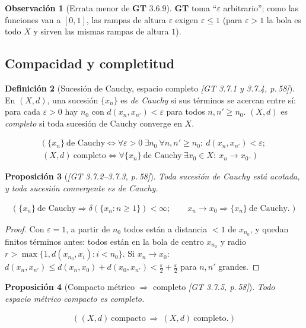 \documentclass[11pt,a4paper]{article}
\newcommand{\lgc}[1]{\par\vspace{-3pt}\begin{gather*}\big(\;#1\;\big)\end{gather*}\vspace{-6pt}}
\theoremstyle{definition}
\newtheorem{definicion}{Definición}[section]
\newtheorem{observacion}[definicion]{Observación}
\theoremstyle{plain}
\newtheorem{proposicion}[definicion]{Proposición}
\newcommand{\fnt}[1]{{\normalfont\small\itshape\color{gray!150!black}[#1]}}
\begin{document}
\begin{observacion}[Errata menor de \textbf{GT} 3.6.9]
\textbf{GT} toma ``$\varepsilon$ arbitrario''; como las funciones van a $[0,1]$, las rampas de altura $\varepsilon$ exigen $\varepsilon\le1$ (para $\varepsilon>1$ la bola es todo $X$ y sirven las mismas rampas de altura $1$).
\end{observacion}

\subsection[Compacidad y completitud]{Compacidad y completitud}\label{cp:sub-compl}

\begin{definicion}[Sucesión de Cauchy, espacio completo \fnt{GT 3.7.1 y 3.7.4, p.\,58}]
En $(X,d)$, una sucesión $\{x_n\}$ es \emph{de Cauchy} si sus términos se acercan entre sí: para cada $\varepsilon>0$ hay $n_0$ con $d(x_n,x_{n'})<\varepsilon$ para todos $n,n'\ge n_0$. $(X,d)$ es \emph{completo} si toda sucesión de Cauchy converge en $X$.
\lgc{\{x_n\}\ \text{de Cauchy}\iff\forall\varepsilon>0\ \exists n_0\ \forall n,n'\ge n_0:\ d(x_n,x_{n'})<\varepsilon;\\
(X,d)\ \text{completo}\iff \forall\{x_n\}\ \text{de Cauchy}\ \exists x_0\in X:\ x_n\to x_0.}
\end{definicion}

\begin{proposicion}[\fnt{GT 3.7.2--3.7.3, p.\,58}]\label{cp:cauchy}
Toda sucesión de Cauchy está acotada, y toda sucesión convergente es de Cauchy.
\lgc{\{x_n\}\ \text{de Cauchy}\Rightarrow \delta(\{x_n: n\ge1\})<\infty;\qquad x_n\to x_0\Rightarrow\{x_n\}\ \text{de Cauchy}.}
\end{proposicion}

\begin{proof}
Con $\varepsilon=1$, a partir de $n_0$ todos están a distancia $<1$ de $x_{n_0}$, y quedan finitos términos antes: todos están en la bola de centro $x_{n_0}$ y radio $r>\max\{1,d(x_{n_0},x_i): i<n_0\}$. Si $x_n\to x_0$: $d(x_n,x_{n'})\le d(x_n,x_0)+d(x_0,x_{n'})<\tfrac\varepsilon2+\tfrac\varepsilon2$ para $n,n'$ grandes.
\end{proof}

\begin{proposicion}[Compacto métrico $\Rightarrow$ completo \fnt{GT 3.7.5, p.\,58}]\label{cp:compcompl}
Todo espacio métrico compacto es completo.
\lgc{(X,d)\ \text{compacto}\ \Rightarrow\ (X,d)\ \text{completo}.}
\end{proposicion}
\end{document}

